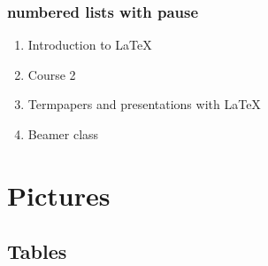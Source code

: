 \documentclass{beamer}
\begin{document}
\begin{frame}\frametitle{numbered lists with pause}
\begin{enumerate}
    \item Introduction to  \LaTeX \pause
    \item Course 2 \pause
    \item Termpapers and presentations with \LaTeX \pause
    \item Beamer class
\end{enumerate}
\end{frame}

\section{Pictures}
\subsection{Tables}
\end{document}
